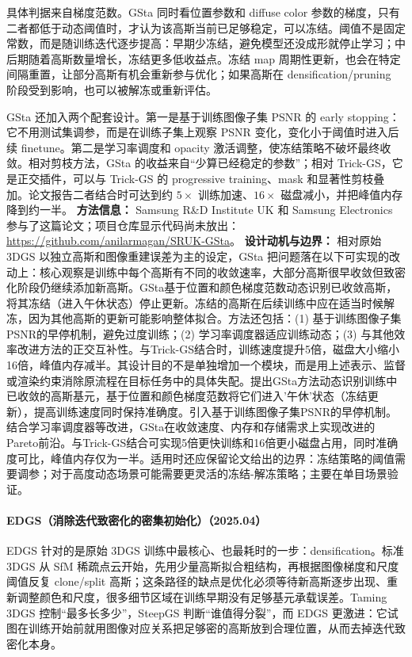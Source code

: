 具体判据来自梯度范数。GSta 同时看位置参数和 diffuse color 参数的梯度，只有二者都低于动态阈值时，才认为该高斯当前已足够稳定，可以冻结。阈值不是固定常数，而是随训练迭代逐步提高：早期少冻结，避免模型还没成形就停止学习；中后期随着高斯数量增长，冻结更多低收益点。冻结 map 周期性更新，也会在特定间隔重置，让部分高斯有机会重新参与优化；如果高斯在 densification/pruning 阶段受到影响，也可以被解冻或重新评估。

GSta 还加入两个配套设计。第一是基于训练图像子集 PSNR 的 early stopping：它不用测试集调参，而是在训练子集上观察 PSNR 变化，变化小于阈值时进入后续 finetune。第二是学习率调度和 opacity 激活调整，使冻结策略不破坏最终收敛。相对剪枝方法，GSta 的收益来自“少算已经稳定的参数”；相对 Trick-GS，它是正交插件，可以与 Trick-GS 的 progressive training、mask 和显著性剪枝叠加。论文报告二者结合时可达到约 $5\times$ 训练加速、$16\times$ 磁盘减小，并把峰值内存降到约一半。
\textbf{方法信息：} Samsung R\&D Institute UK 和 Samsung Electronics 参与了这篇论文；项目仓库显示代码尚未放出：\url{https://github.com/anilarmagan/SRUK-GSta}。
\textbf{设计动机与边界：} 相对原始 3DGS 以独立高斯和图像重建误差为主的设定，GSta 把问题落在以下可实现的改动上：核心观察是训练中每个高斯有不同的收敛速率，大部分高斯很早收敛但致密化阶段仍继续添加新高斯。GSta基于位置和颜色梯度范数动态识别已收敛高斯，将其冻结（进入午休状态）停止更新。冻结的高斯在后续训练中应在适当时候解冻，因为其他高斯的更新可能影响整体拟合。方法还包括：(1) 基于训练图像子集PSNR的早停机制，避免过度训练；(2) 学习率调度器适应训练动态；(3) 与其他效率改进方法的正交互补性。与Trick-GS结合时，训练速度提升5倍，磁盘大小缩小16倍，峰值内存减半。其设计目的不是单独增加一个模块，而是用上述表示、监督或渲染约束消除原流程在目标任务中的具体失配。提出GSta方法动态识别训练中已收敛的高斯基元，基于位置和颜色梯度范数将它们进入'午休'状态（冻结更新），提高训练速度同时保持准确度。引入基于训练图像子集PSNR的早停机制。结合学习率调度器等改进，GSta在收敛速度、内存和存储需求上实现改进的Pareto前沿。与Trick-GS结合可实现5倍更快训练和16倍更小磁盘占用，同时准确度可比，峰值内存仅为一半。适用时还应保留论文给出的边界：冻结策略的阈值需要调参；对于高度动态场景可能需要更灵活的冻结-解冻策略；主要在单目场景验证。
\paragraph{EDGS（消除迭代致密化的密集初始化）（2025.04）\cite{2504_13204}}
EDGS 针对的是原始 3DGS 训练中最核心、也最耗时的一步：densification。标准 3DGS 从 SfM 稀疏点云开始，先用少量高斯拟合粗结构，再根据图像梯度和尺度阈值反复 clone/split 高斯；这条路径的缺点是优化必须等待新高斯逐步出现、重新调整颜色和尺度，很多细节区域在训练早期没有足够基元承载误差。Taming 3DGS 控制“最多长多少”，SteepGS 判断“谁值得分裂”，而 EDGS 更激进：它试图在训练开始前就用图像对应关系把足够密的高斯放到合理位置，从而去掉迭代致密化本身。

